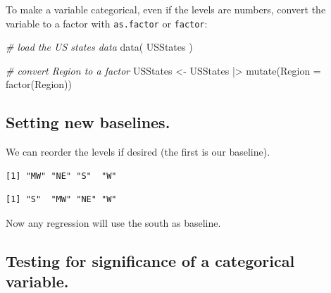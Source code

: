 \documentclass[
  letterpaper,
  DIV=11,
  numbers=noendperiod]{scrreprt}
\newenvironment{Shaded}{\begin{snugshade}}{\end{snugshade}}
\newcommand{\AttributeTok}[1]{\textcolor[rgb]{0.49,0.56,0.16}{#1}}
\newcommand{\CommentTok}[1]{\textcolor[rgb]{0.38,0.63,0.69}{\textit{#1}}}
\newcommand{\FunctionTok}[1]{\textcolor[rgb]{0.02,0.16,0.49}{#1}}
\newcommand{\NormalTok}[1]{\textcolor[rgb]{0.00,0.44,0.13}{#1}}
\newcommand{\OtherTok}[1]{\textcolor[rgb]{0.00,0.44,0.13}{#1}}
\newcommand{\SpecialCharTok}[1]{\textcolor[rgb]{0.25,0.44,0.63}{#1}}
\newcommand{\StringTok}[1]{\textcolor[rgb]{0.25,0.44,0.63}{#1}}
\begin{document}
To make a variable categorical, even if the levels are numbers, convert
the variable to a factor with \texttt{as.factor} or \texttt{factor}:

\begin{Shaded}
\begin{Highlighting}[]
\CommentTok{\# load the US states data}
\FunctionTok{data}\NormalTok{( USStates )}

\CommentTok{\# convert Region to a factor}
\NormalTok{USStates }\OtherTok{\textless{}{-}}\NormalTok{ USStates }\SpecialCharTok{|\textgreater{}} 
  \FunctionTok{mutate}\NormalTok{(}\AttributeTok{Region =} \FunctionTok{factor}\NormalTok{(Region))}
\end{Highlighting}
\end{Shaded}

\hypertarget{setting-new-baselines.}{%
\subsection{Setting new baselines.}\label{setting-new-baselines.}}

We can reorder the levels if desired (the first is our baseline).

\begin{Shaded}
\end{Shaded}

\begin{verbatim}
[1] "MW" "NE" "S"  "W" 
\end{verbatim}

\begin{Shaded}
\end{Shaded}

\begin{verbatim}
[1] "S"  "MW" "NE" "W" 
\end{verbatim}

Now any regression will use the south as baseline.

\hypertarget{testing-for-significance-of-a-categorical-variable.}{%
\subsection{Testing for significance of a categorical
variable.}\label{testing-for-significance-of-a-categorical-variable.}}
\end{document}

